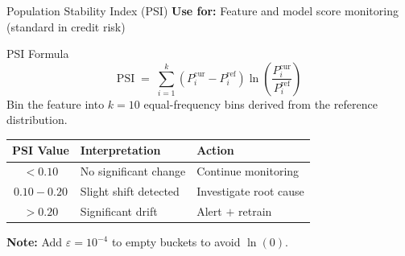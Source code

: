\documentclass[10pt,aspectratio=169]{beamer}
\begin{document}
\begin{frame}{Population Stability Index (PSI)}
  \textbf{Use for:} Feature and model score monitoring (standard in credit risk)
  \vspace{0.15cm}
  \begin{block}{PSI Formula}
    \[
      \mathrm{PSI} \;=\; \sum_{i=1}^{k}\!\left(P_i^{\mathrm{cur}} - P_i^{\mathrm{ref}}\right)\ln\!\left(\frac{P_i^{\mathrm{cur}}}{P_i^{\mathrm{ref}}}\right)
    \]
    Bin the feature into $k{=}10$ equal-frequency bins derived from the reference distribution.
  \end{block}
  \vspace{0.2cm}
  \begin{center}
  \renewcommand{\arraystretch}{1.2}
  \begin{tabular}{@{}cll@{}}
    \toprule
    \textbf{PSI Value} & \textbf{Interpretation} & \textbf{Action} \\
    \midrule
    $< 0.10$      & \textcolor{mgreen}{No significant change}  & Continue monitoring \\
    $0.10 - 0.20$ & \textcolor{morange}{Slight shift detected} & Investigate root cause \\
    $> 0.20$      & \textcolor{mred}{Significant drift}        & Alert $+$ retrain \\
    \bottomrule
  \end{tabular}
  \end{center}
  \vspace{0.1cm}
  \textbf{Note:} Add $\varepsilon = 10^{-4}$ to empty buckets to avoid $\ln(0)$.
\end{frame}
\end{document}
